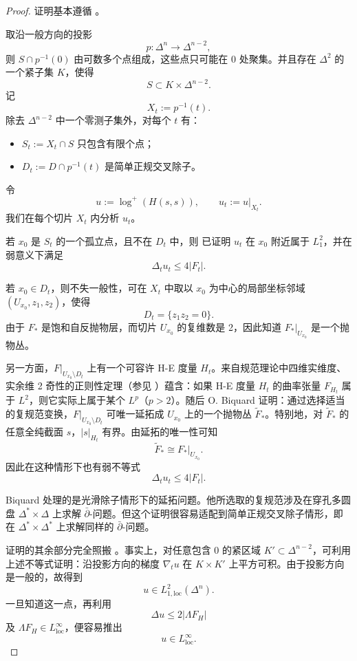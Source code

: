 \begin{proof}
证明基本遵循 \cite[Section 1]{B-S}。

取沿一般方向的投影
\[
p:\Delta^n\to \Delta^{n-2},
\]
则 \(S\cap p^{-1}(0)\) 由可数多个点组成，这些点只可能在 0 处聚集。并且存在 \(\Delta^2\) 的一个紧子集 \(K\)，使得
\[
S\subset K\times \Delta^{n-2}.
\]
记
\[
X_t:=p^{-1}(t).
\]
除去 \(\Delta^{n-2}\) 中一个零测子集外，对每个 \(t\) 有：
\begin{itemize}
\item \(S_t:=X_t\cap S\) 只包含有限个点；
\item \(D_t:=D\cap p^{-1}(t)\) 是简单正规交叉除子。
\end{itemize}
令
\[
u:=\log^+(H(s,s)),\qquad u_t:=u|_{X_t}.
\]
我们在每个切片 \(X_t\) 内分析 \(u_t\)。

若 \(x_0\) 是 \(S_t\) 的一个孤立点，且不在 \(D_t\) 中，则 \cite[Section 3]{Ba} 已证明 \(u_t\) 在 \(x_0\) 附近属于 \(L_1^2\)，并在弱意义下满足
\[
\Delta_t u_t\le 4|F_t|.
\]

若 \(x_0\in D_t\)，则不失一般性，可在 \(X_t\) 中取以 \(x_0\) 为中心的局部坐标邻域 \((U_{x_0},z_1,z_2)\)，使得
\[
D_t=\{z_1z_2=0\}.
\]
由于 \(F_*\) 是饱和自反抛物层，而切片 \(U_{x_0}\) 的复维数是 2，因此知道 \(F_*|_{U_{x_0}}\) 是一个抛物丛。

另一方面，\(F|_{U_{x_0}\setminus D_t}\) 上有一个可容许 H-E 度量 \(H_t\)。来自规范理论中四维实维度、实余维 2 奇性的正则性定理（参见 \cite{Si-Si}）蕴含：如果 H-E 度量 \(H_t\) 的曲率张量 \(F_{H_t}\) 属于 \(L^2\)，则它实际上属于某个 \(L^p\)（\(p>2\)）。随后 O. Biquard \cite[Theorem 2.1]{Bi2} 证明：通过选择适当的复规范变换，\(F|_{U_{x_0}\setminus D_t}\) 可唯一延拓成 \(U_{x_0}\) 上的一个抛物丛 \(\widetilde F_*\)。特别地，对 \(\widetilde F_*\) 的任意全纯截面 \(s\)，\(|s|_{H_t}\) 有界。由延拓的唯一性可知
\[
\widetilde F_*\cong F_*|_{U_{x_0}}.
\]
因此在这种情形下也有弱不等式
\[
\Delta_t u_t\le 4|F_t|.
\]

\begin{remark}
Biquard 处理的是光滑除子情形下的延拓问题。他所选取的复规范涉及在穿孔多圆盘 \(\Delta^*\times \Delta\) 上求解 \(\bar\partial\)-问题。但这个证明很容易适配到简单正规交叉除子情形，即在 \(\Delta^*\times \Delta^*\) 上求解同样的 \(\bar\partial\)-问题。
\end{remark}

证明的其余部分完全照搬 \cite[Section 1]{B-S}。事实上，对任意包含 0 的紧区域 \(K'\subset \Delta^{n-2}\)，可利用上述不等式证明：沿投影方向的梯度 \(\nabla_t u\) 在 \(K\times K'\) 上平方可积。由于投影方向是一般的，故得到
\[
u\in L_{1,\mathrm{loc}}^2(\Delta^n).
\]
一旦知道这一点，再利用
\[
\Delta u\le 2|\Lambda F_H|
\]
及 \(\Lambda F_H\in L^\infty_{\mathrm{loc}}\)，便容易推出
\[
u\in L^\infty_{\mathrm{loc}}.
\]
\end{proof}

